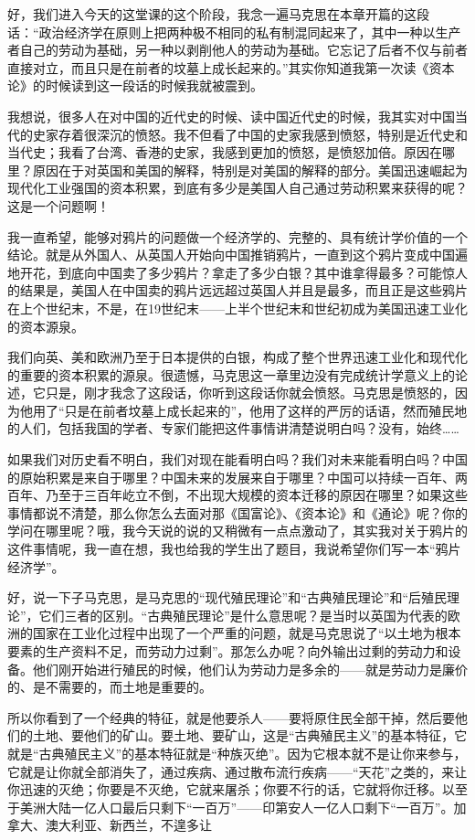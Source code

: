 \documentclass[UTF8, 12pt, a4paper]{ctexrep}
\begin{document}
好，我们进入今天的这堂课的这个阶段，我念一遍马克思在本章开篇的这段话：“政治经济学在原则上把两种极不相同的私有制混同起来了，其中一种以生产者自己的劳动为基础，另一种以剥削他人的劳动为基础。它忘记了后者不仅与前者直接对立，而且只是在前者的坟墓上成长起来的。”其实你知道我第一次读《资本论》的时候读到这一段话的时候我就被震到。

我想说，很多人在对中国的近代史的时候、读中国近代史的时候，我其实对中国当代的史家存着很深沉的愤怒。我不但看了中国的史家我感到愤怒，特别是近代史和当代史；我看了台湾、香港的史家，我感到更加的愤怒，是愤怒加倍。原因在哪里？原因在于对英国和美国的解释，特别是对美国的解释的部分。美国迅速崛起为现代化工业强国的资本积累，到底有多少是美国人自己通过劳动积累来获得的呢？这是一个问题啊！

我一直希望，能够对鸦片的问题做一个经济学的、完整的、具有统计学价值的一个结论。就是从外国人、从英国人开始向中国推销鸦片，一直到这个鸦片变成中国遍地开花，到底向中国卖了多少鸦片？拿走了多少白银？其中谁拿得最多？可能惊人的结果是，美国人在中国卖的鸦片远远超过英国人并且是最多，而且正是这些鸦片在上个世纪末，不是，在19世纪末——上半个世纪末和世纪初成为美国迅速工业化的资本源泉。

我们向英、美和欧洲乃至于日本提供的白银，构成了整个世界迅速工业化和现代化的重要的资本积累的源泉。很遗憾，马克思这一章里边没有完成统计学意义上的论述，它只是，刚才我念了这段话，你听到这段话你就会愤怒。马克思是愤怒的，因为他用了“只是在前者坟墓上成长起来的”，他用了这样的严厉的话语，然而殖民地的人们，包括我国的学者、专家们能把这件事情讲清楚说明白吗？没有，始终……

如果我们对历史看不明白，我们对现在能看明白吗？我们对未来能看明白吗？中国的原始积累是来自于哪里？中国未来的发展来自于哪里？中国可以持续一百年、两百年、乃至于三百年屹立不倒，不出现大规模的资本迁移的原因在哪里？如果这些事情都说不清楚，那么你怎么去面对那《国富论》、《资本论》和《通论》呢？你的学问在哪里呢？哦，我今天说的说的又稍微有一点点激动了，其实我对关于鸦片的这件事情呢，我一直在想，我也给我的学生出了题目，我说希望你们写一本“鸦片经济学”。

好，说一下子马克思，是马克思的“现代殖民理论”和“古典殖民理论”和“后殖民理论”，它们三者的区别。“古典殖民理论”是什么意思呢？是当时以英国为代表的欧洲的国家在工业化过程中出现了一个严重的问题，就是马克思说了“以土地为根本要素的生产资料不足，而劳动力过剩”。那怎么办呢？向外输出过剩的劳动力和设备。他们刚开始进行殖民的时候，他们认为劳动力是多余的——就是劳动力是廉价的、是不需要的，而土地是重要的。

所以你看到了一个经典的特征，就是他要杀人——要将原住民全部干掉，然后要他们的土地、要他们的矿山。要土地、要矿山，这是“古典殖民主义”的基本特征，它就是“古典殖民主义”的基本特征就是“种族灭绝”。因为它根本就不是让你来参与，它就是让你就全部消失了，通过疾病、通过散布流行疾病——“天花”之类的，来让你迅速的灭绝；你要是不灭绝，它就来屠杀；你要不行的话，它就将你迁移。以至于美洲大陆一亿人口最后只剩下“一百万”——印第安人一亿人口剩下“一百万”。加拿大、澳大利亚、新西兰，不遑多让
\end{document}
